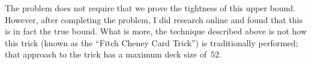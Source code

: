 The problem does not require that we prove the tightness of this upper bound.  However, after completing the problem, I did research online and found that this is in fact the true bound.  What is more, the technique described above is not how this trick (known as the ``Fitch Cheney Card Trick'') is traditionally performed; that approach to the trick has a maximum deck size of~52.
